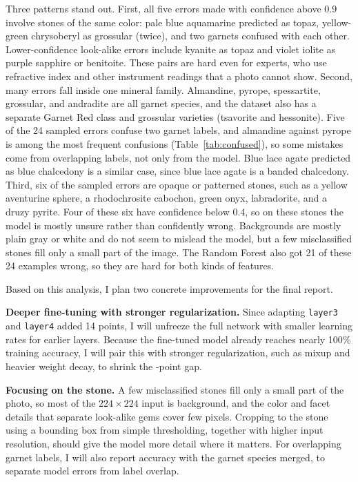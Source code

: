\documentclass{article}
\begin{document}
Three patterns stand out. First, all five errors made with confidence above 0.9 involve stones of the same color: pale blue aquamarine predicted as topaz, yellow-green chrysoberyl as grossular (twice), and two garnets confused with each other. Lower-confidence look-alike errors include kyanite as topaz and violet iolite as purple sapphire or benitoite. These pairs are hard even for experts, who use refractive index and other instrument readings that a photo cannot show. Second, many errors fall inside one mineral family. Almandine, pyrope, spessartite, grossular, and andradite are all garnet species, and the dataset also has a separate Garnet Red class and grossular varieties (tsavorite and hessonite). Five of the 24 sampled errors confuse two garnet labels, and almandine against pyrope is among the most frequent confusions (Table~\ref{tab:confused}), so some mistakes come from overlapping labels, not only from the model. Blue lace agate predicted as blue chalcedony is a similar case, since blue lace agate is a banded chalcedony. Third, six of the sampled errors are opaque or patterned stones, such as a yellow aventurine sphere, a rhodochrosite cabochon, green onyx, labradorite, and a druzy pyrite. Four of these six have confidence below 0.4, so on these stones the model is mostly unsure rather than confidently wrong. Backgrounds are mostly plain gray or white and do not seem to mislead the model, but a few misclassified stones fill only a small part of the image. The Random Forest also got 21 of these 24 examples wrong, so they are hard for both kinds of features.

Based on this analysis, I plan two concrete improvements for the final report.

\textbf{Deeper fine-tuning with stronger regularization.} Since adapting \texttt{layer3} and \texttt{layer4} added 14 points, I will unfreeze the full network with smaller learning rates for earlier layers. Because the fine-tuned model already reaches nearly 100\% training accuracy, I will pair this with stronger regularization, such as mixup and heavier weight decay, to shrink the \FTGap{}-point gap.

\textbf{Focusing on the stone.} A few misclassified stones fill only a small part of the photo, so most of the $224\times224$ input is background, and the color and facet details that separate look-alike gems cover few pixels. Cropping to the stone using a bounding box from simple thresholding, together with higher input resolution, should give the model more detail where it matters. For overlapping garnet labels, I will also report accuracy with the garnet species merged, to separate model errors from label overlap.
\end{document}
